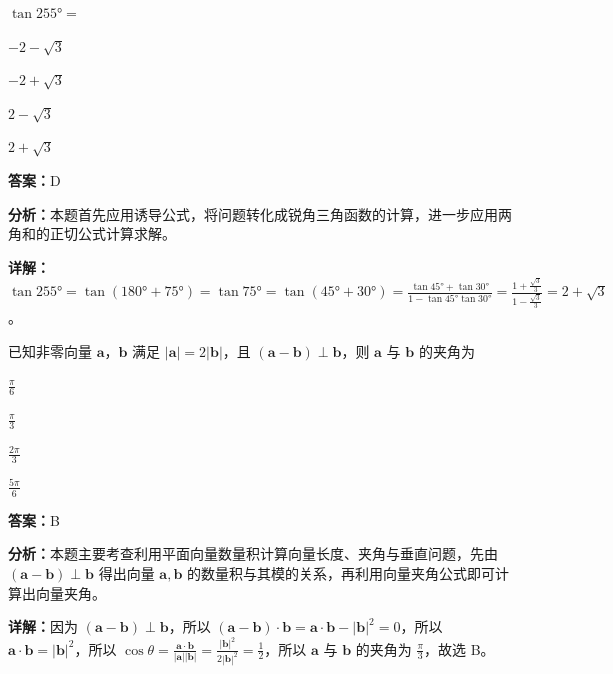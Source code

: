\begin{question}[points=5]
$\tan 255° =$
\begin{choices}
  \item $-2-\sqrt{3}$
  \item $-2+\sqrt{3}$
  \item $2-\sqrt{3}$
  \item $2+\sqrt{3}$
\end{choices}
\begin{solution}
\textbf{答案：}D

\textbf{分析：}本题首先应用诱导公式，将问题转化成锐角三角函数的计算，进一步应用两角和的正切公式计算求解。

\textbf{详解：}$\tan 255° = \tan(180°+75°) = \tan 75° = \tan(45°+30°) = \frac{\tan 45°+\tan 30°}{1-\tan 45°\tan 30°} = \frac{1+\frac{\sqrt{3}}{3}}{1-\frac{\sqrt{3}}{3}} = 2+\sqrt{3}$。
\end{solution}
\end{question}

\begin{question}[points=5]
已知非零向量 $\boldsymbol{a}$，$\boldsymbol{b}$ 满足 $|\boldsymbol{a}|=2|\boldsymbol{b}|$，且 $(\boldsymbol{a}-\boldsymbol{b}) \perp \boldsymbol{b}$，则 $\boldsymbol{a}$ 与 $\boldsymbol{b}$ 的夹角为
\begin{choices}
  \item $\frac{\pi}{6}$
  \item $\frac{\pi}{3}$
  \item $\frac{2\pi}{3}$
  \item $\frac{5\pi}{6}$
\end{choices}
\begin{solution}
\textbf{答案：}B

\textbf{分析：}本题主要考查利用平面向量数量积计算向量长度、夹角与垂直问题，先由 $(\boldsymbol{a}-\boldsymbol{b}) \perp \boldsymbol{b}$ 得出向量 $\boldsymbol{a},\boldsymbol{b}$ 的数量积与其模的关系，再利用向量夹角公式即可计算出向量夹角。

\textbf{详解：}因为 $(\boldsymbol{a}-\boldsymbol{b}) \perp \boldsymbol{b}$，所以 $(\boldsymbol{a}-\boldsymbol{b})\cdot\boldsymbol{b} = \boldsymbol{a}\cdot\boldsymbol{b} - |\boldsymbol{b}|^2 = 0$，所以 $\boldsymbol{a}\cdot\boldsymbol{b} = |\boldsymbol{b}|^2$，所以 $\cos\theta = \frac{\boldsymbol{a}\cdot\boldsymbol{b}}{|\boldsymbol{a}||\boldsymbol{b}|} = \frac{|\boldsymbol{b}|^2}{2|\boldsymbol{b}|^2} = \frac{1}{2}$，所以 $\boldsymbol{a}$ 与 $\boldsymbol{b}$ 的夹角为 $\frac{\pi}{3}$，故选 B。
\end{solution}
\end{question}

